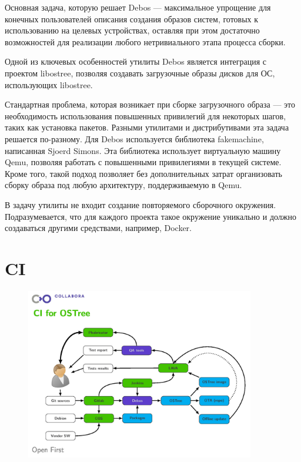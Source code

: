 \documentclass[10pt, a5paper]{article}
\begin{document}
Основная задача, которую решает Debos --- максимальное упрощение для конечных пользователей описания создания образов систем, готовых к использованию на целевых устройствах, оставляя при этом достаточно возможностей для реализации любого нетривиального этапа процесса сборки.

Одной из ключевых особенностей утилиты Debos является интеграция с проектом libostree, позволяя создавать загрузочные образы дисков для ОС, использующих libostree.

Стандартная проблема, которая возникает при сборке загрузочного образа --- это необходимость использования повышенных привилегий для некоторых шагов, таких как установка пакетов. Разными утилитами и дистрибутивами эта задача решается по-разному. Для Debos используется библиотека fakemachine\cite{bib9}, написанная Sjoerd Simons. Эта библиотека использует виртуальную машину Qemu, позволяя работать с повышенными привилегиями в текущей системе. Кроме того, такой подход позволяет без дополнительных затрат организовать сборку образа под любую архитектуру, поддерживаемую в Qemu.

В задачу утилиты не входит создание повторяемого сборочного окружения. Подразумевается, что для каждого проекта такое окружение уникально и должно создаваться другими средствами, например, Docker.

\section*{CI}

\begin{center}
\begin{figure}[h!]
  \centering
  \includegraphics[width=10cm]{2019_Pynkin}  
  \label{pynkin:fig1}
\end{figure}
\end{center} 
\end{document}
